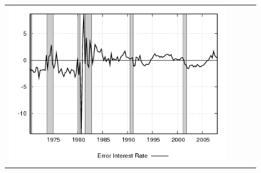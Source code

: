 \begin{figure}
\begin{tabular}{cccc}
\includegraphics[scale=0.22]{results_wlsinit/fedfunds_err.png} \\ \\ 
 
\end{tabular}
\end{figure}
